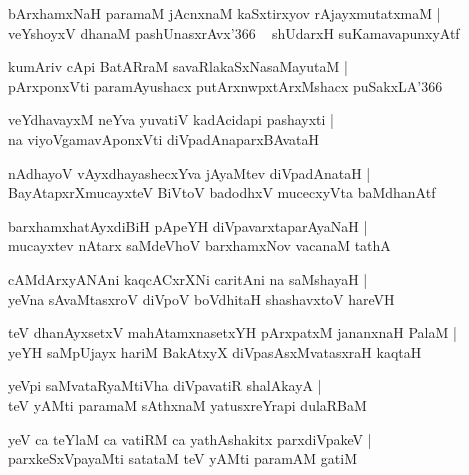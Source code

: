 \documentclass[twoside,12pt,openright]{book}
\newcounter{shloka}[chapter]
\begin{document}
\begin{shloka}%
bArxhamxNaH paramaM jAcnxnaM kaSxtirxyov rAjayxmutatxmaM |\\
veYshoyxV dhanaM pashUnasxrAvx\char'366 ~ shUdarxH suKamavapunxyAtf
\end{shloka}

\begin{shloka}%
kumAriv cApi BatARraM savaRlakaSxNasaMayutaM |\\
pArxponxVti paramAyushacx putArxnwpxtArxMshacx puSakxLA\char'366
\end{shloka}

\begin{shloka}%
veYdhavayxM neYva yuvatiV kadAcidapi pashayxti |\\
na viyoVgamavAponxVti diVpadAnaparxBAvataH 
\end{shloka}

\begin{shloka}%
nAdhayoV vAyxdhayashecxYva jAyaMtev diVpadAnataH |\\
BayAtapxrXmucayxteV BiVtoV badodhxV mucecxyVta baMdhanAtf
\end{shloka}

\begin{shloka}%
barxhamxhatAyxdiBiH pApeYH diVpavarxtaparAyaNaH |\\
mucayxtev nAtarx saMdeVhoV barxhamxNov vacanaM tathA 
\end{shloka}

\begin{shloka}%
cAMdArxyANAni kaqcACxrXNi caritAni na saMshayaH |\\
yeVna sAvaMtasxroV diVpoV boVdhitaH shashavxtoV hareVH
\end{shloka}

\begin{shloka}%
teV dhanAyxsetxV mahAtamxnasetxYH pArxpatxM jananxnaH PalaM |\\
yeYH saMpUjayx hariM BakAtxyX diVpasAsxMvatasxraH kaqtaH
\end{shloka}

\begin{shloka}%
yeVpi saMvataRyaMtiVha diVpavatiR shalAkayA |\\
teV yAMti paramaM sAthxnaM yatusxreYrapi dulaRBaM 
\end{shloka}

\begin{shloka}%
yeV ca teYlaM ca vatiRM ca yathAshakitx parxdiVpakeV |\\
parxkeSxVpayaMti satataM teV yAMti paramAM gatiM 
\end{shloka}
\end{document}
